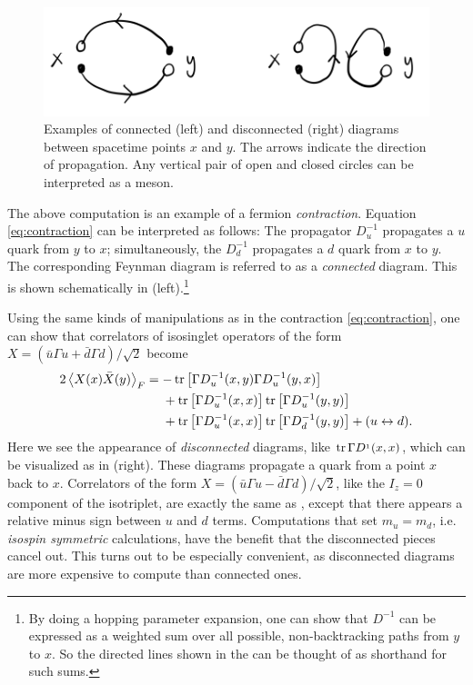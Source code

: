 \begin{figure}
\includegraphics[width=\textwidth]{figs/connected_disconnected.pdf}
\caption{Examples of connected (left) and disconnected (right) diagrams
between spacetime points $x$ and $y$. The arrows indicate the direction of
propagation. Any vertical pair of open and closed circles can be interpreted as
a meson.}
\label{fig:contraction}
\end{figure}

The above computation is an example of a fermion {\it contraction}.
Equation \eqref{eq:contraction} can be interpreted as follows: The propagator
$D^{-1}_u$ propagates a $u$ quark from $y$ to $x$; simultaneously, the
$D^{-1}_d$ propagates a $d$ quark from $x$ to $y$. The corresponding Feynman
diagram is referred to as a {\it connected} 
diagram. This is shown
schematically in  (left).\footnote{By doing a hopping
parameter expansion, one can show that $D^{-1}$ can be expressed as a weighted
sum over all possible, non-backtracking paths from $y$ to $x$. So the directed lines 
shown in the  can be thought of as shorthand
for such sums.}

Using the same kinds of manipulations as in the contraction
\eqref{eq:contraction}, one can show that correlators of 
isosinglet operators of the form
$X=\left(\bar{u}\Gamma u+\bar{d}\Gamma d\right)/\sqrt{2}$ become
\begin{equation}\begin{aligned}\label{eq:disconnectedContribution}
2\ev{X(x)\bar{X}(y)}_F&=
-\tr\left[\Gamma D_u^{-1}(x,y)\Gamma D_u^{-1}(y,x)\right]\\
&~~~~+\tr\left[\Gamma D_u^{-1}(x,x)\right]\tr\left[\Gamma D_u^{-1}(y,y)\right]\\
&~~~~+\tr\left[\Gamma D_u^{-1}(x,x)\right]\tr\left[\Gamma D_d^{-1}(y,y)\right]
+(u\leftrightarrow d).
\end{aligned}\end{equation}
Here we see the appearance of {\it disconnected}
diagrams, like $\tr\Gamma D^{_1}(x,x)$, which can be visualized as in
 (right). These diagrams propagate a quark from a point
$x$ back to $x$. Correlators of the form
$X=\left(\bar{u}\Gamma u-\bar{d}\Gamma d\right)/\sqrt{2}$, like the $I_z=0$
component of the isotriplet, are exactly the same as
, except that there appears a relative
minus sign between $u$ and $d$ terms. Computations that set $m_u=m_d$, i.e.
{\it isospin symmetric} calculations, have
the benefit that the disconnected pieces cancel out. This turns out to be
especially convenient, as disconnected diagrams are more expensive to
compute than connected ones.

